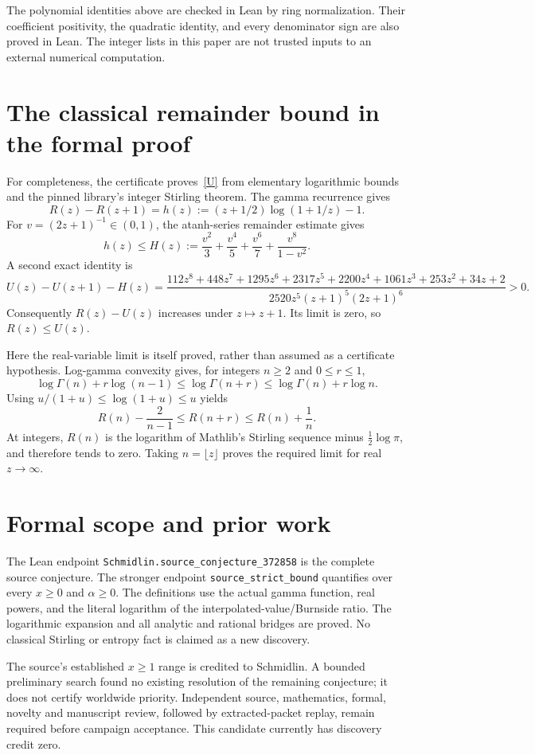 \documentclass[11pt]{article}
\begin{document}
The polynomial identities above are checked in Lean by ring normalization.
Their coefficient positivity, the quadratic identity, and every denominator
sign are also proved in Lean. The integer lists in this paper are not trusted
inputs to an external numerical computation.

\newpage
\section{The classical remainder bound in the formal proof}
For completeness, the certificate proves~\eqref{U} from elementary logarithmic
bounds and the pinned library's integer Stirling theorem. The gamma recurrence gives
\[
 R(z)-R(z+1)=h(z):=(z+1/2)\log(1+1/z)-1.
\]
For $v=(2z+1)^{-1}\in(0,1)$, the atanh-series remainder estimate gives
\[
 h(z)\le H(z):=\frac{v^2}{3}+\frac{v^4}{5}+\frac{v^6}{7}
                    +\frac{v^8}{1-v^2}.
\]
A second exact identity is
\[
 U(z)-U(z+1)-H(z)=
 \frac{112z^8+448z^7+1295z^6+2317z^5+2200z^4+1061z^3+253z^2+34z+2}
 {2520z^5(z+1)^5(2z+1)^6}>0.
\]
Consequently $R(z)-U(z)$ increases under $z\mapsto z+1$. Its limit is zero,
so $R(z)\le U(z)$.

Here the real-variable limit is itself proved, rather than assumed as a
certificate hypothesis. Log-gamma convexity gives, for integers $n\ge2$ and
$0\le r\le1$,
\[
 \log\Gamma(n)+r\log(n-1)\le\log\Gamma(n+r)
                       \le\log\Gamma(n)+r\log n.
\]
Using $u/(1+u)\le\log(1+u)\le u$ yields
\[
 R(n)-\frac2{n-1}\le R(n+r)\le R(n)+\frac1n.
\]
At integers, $R(n)$ is the logarithm of Mathlib's Stirling sequence minus
$\tfrac12\log\pi$, and therefore tends to zero. Taking $n=\lfloor z\rfloor$
proves the required limit for real $z\to\infty$.

\section{Formal scope and prior work}
The Lean endpoint \texttt{Schmidlin.source\_conjecture\_372858} is the complete
source conjecture. The stronger endpoint \texttt{source\_strict\_bound} quantifies
over every $x\ge0$ and $\alpha\ge0$. The definitions use the actual gamma function,
real powers, and the literal logarithm of the interpolated-value/Burnside ratio.
The logarithmic expansion and all analytic and rational bridges are proved.
No classical Stirling or entropy fact is claimed as a new discovery.

The source's established $x\ge1$ range is credited to Schmidlin. A bounded
preliminary search found no existing resolution of the remaining conjecture;
it does not certify worldwide priority. Independent source, mathematics, formal,
novelty and manuscript review, followed by extracted-packet replay, remain
required before campaign acceptance. This candidate currently has discovery
credit zero.
\end{document}

